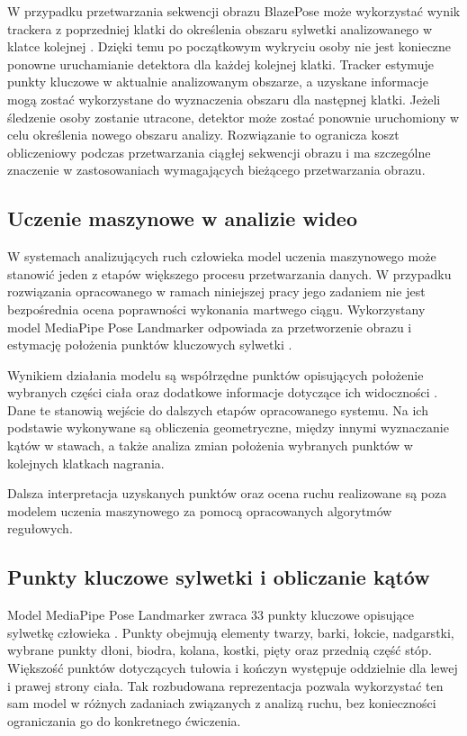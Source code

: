 W przypadku przetwarzania sekwencji obrazu BlazePose może wykorzystać wynik trackera z poprzedniej klatki do określenia obszaru sylwetki analizowanego w klatce kolejnej \cite{bazarevsky2020blazepose}. Dzięki temu po początkowym wykryciu osoby nie jest konieczne ponowne uruchamianie detektora dla każdej kolejnej klatki. Tracker estymuje punkty kluczowe w aktualnie analizowanym obszarze, a uzyskane informacje mogą zostać wykorzystane do wyznaczenia obszaru dla następnej klatki. Jeżeli śledzenie osoby zostanie utracone, detektor może zostać ponownie uruchomiony w celu określenia nowego obszaru analizy. Rozwiązanie to ogranicza koszt obliczeniowy podczas przetwarzania ciągłej sekwencji obrazu i ma szczególne znaczenie w zastosowaniach wymagających bieżącego przetwarzania obrazu.

\subsection{Uczenie maszynowe w analizie wideo}

W systemach analizujących ruch człowieka model uczenia maszynowego może stanowić jeden z etapów większego procesu przetwarzania danych. W przypadku rozwiązania opracowanego w ramach niniejszej pracy jego zadaniem nie jest bezpośrednia ocena poprawności wykonania martwego ciągu. Wykorzystany model MediaPipe Pose Landmarker odpowiada za przetworzenie obrazu i estymację położenia punktów kluczowych sylwetki \cite{bazarevsky2020blazepose,mediapipe_pose_landmarker}.

Wynikiem działania modelu są współrzędne punktów opisujących położenie wybranych części ciała oraz dodatkowe informacje dotyczące ich widoczności \cite{mediapipe_pose_landmarker}. Dane te stanowią wejście do dalszych etapów opracowanego systemu. Na ich podstawie wykonywane są obliczenia geometryczne, między innymi wyznaczanie kątów w stawach, a także analiza zmian położenia wybranych punktów w kolejnych klatkach nagrania.

Dalsza interpretacja uzyskanych punktów oraz ocena ruchu realizowane są poza modelem uczenia maszynowego za pomocą opracowanych algorytmów regułowych.

\subsection{Punkty kluczowe sylwetki i obliczanie kątów}

Model MediaPipe Pose Landmarker zwraca 33 punkty kluczowe opisujące sylwetkę człowieka \cite{bazarevsky2020blazepose,mediapipe_pose_docs}. Punkty obejmują elementy twarzy, barki, łokcie, nadgarstki, wybrane punkty dłoni, biodra, kolana, kostki, pięty oraz przednią część stóp. Większość punktów dotyczących tułowia i kończyn występuje oddzielnie dla lewej i prawej strony ciała. Tak rozbudowana reprezentacja pozwala wykorzystać ten sam model w różnych zadaniach związanych z analizą ruchu, bez konieczności ograniczania go do konkretnego ćwiczenia.

